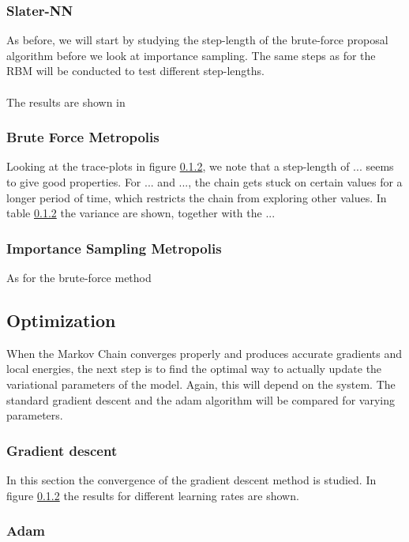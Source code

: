 \subsubsection{Slater-NN}
As before, we will start by studying the step-length of the brute-force proposal algorithm before we look at importance sampling. The same steps as for the RBM will be conducted to test different step-lengths. 
\\
\\
The results are shown in 
\subsubsection{Brute Force Metropolis}
Looking at the trace-plots in figure \ref{}, we note that a step-length of ... seems to give good properties. For ... and ..., the chain gets stuck on certain values for a longer period of time, which restricts the chain from exploring other values. In table \ref{} the variance are shown, together with the ... 
\subsubsection{Importance Sampling Metropolis}
As for the brute-force method
\subsection{Optimization}
When the Markov Chain converges properly and produces accurate gradients and local energies, the next step is to find the optimal way to actually update the variational parameters of the model.  Again, this will depend on the system. The standard gradient descent and the adam algorithm will be compared for varying parameters.
\subsubsection{Gradient descent}
In this section the convergence of the gradient descent method is studied. In figure \ref{} the results for different learning rates are shown. 
\subsubsection{Adam}
